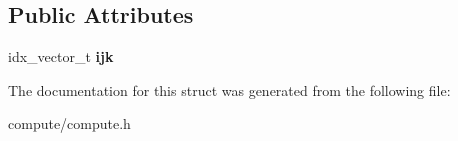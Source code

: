 \subsection*{Public Attributes}
\begin{DoxyCompactItemize}
\item 
\mbox{\label{structmgs_1_1Index_a214547444e512d3a56c8dcdd768003dc}} 
idx\+\_\+vector\+\_\+t {\bfseries ijk}
\end{DoxyCompactItemize}


The documentation for this struct was generated from the following file\+:\begin{DoxyCompactItemize}
\item 
compute/compute.\+h\end{DoxyCompactItemize}
